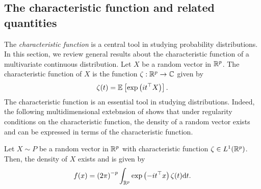 \subsection{The characteristic function and related quantities} \label{sec-charfun}

The \textit{characteristic function} is a central tool in studying probability distributions. In this section, we review general results about the characteristic function of a multivariate continuous distribution. Let $X$ be a random vector in $\Rp$. The characteristic function of $X$ is the function $\zeta : \Rp \rightarrow \C$ given by
\begin{equation*}
    \zeta(t) = \expec{}{\expf{it^\top X}}.
\end{equation*}
The characteristic function is an essential tool in studying distributions. Indeed, the following multidimensional extebnsion of \cite[Theorem 2.4.2]{kolassa2006series} shows that under regularity conditions on the characteristic function, the density of a random vector exists and can be expressed in terms of the characteristic function.

\begin{theorem} \label{thm-char-inversion}
    Let $X \sim P$ be a random vector in $\Rp$ with characteristic function $\zeta \in L^1(\Rp)$. Then, the density of $X$ exists and is given by
    \begin{equation} \label{eq-density-via-charfun}
        f(x) = \left(2\pi\right)^{-p} \intRp{t}{ \expf{-it^\top x}\zeta(t) }.
    \end{equation}
\end{theorem}

